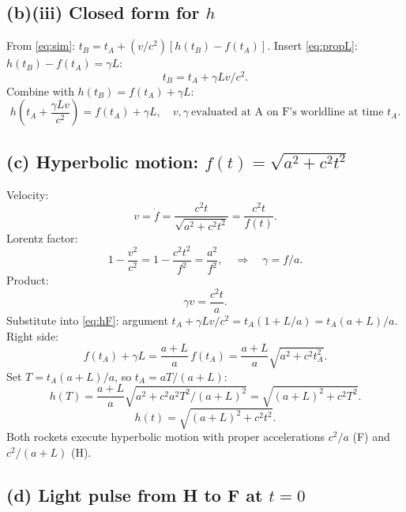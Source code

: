 \documentclass[11pt]{article}
\begin{document}
\subsection*{(b)(iii) Closed form for $h$}

From \eqref{eq:sim}: $t_B = t_A + (v/c^2)[h(t_B)-f(t_A)]$.
Insert \eqref{eq:propL}: $h(t_B)-f(t_A)=\gamma L$:
\[ t_B = t_A + \gamma L v/c^2. \]
Combine with $h(t_B)=f(t_A)+\gamma L$:
\begin{equation}
\boxed{\;h\!\left(t_A+\frac{\gamma L v}{c^2}\right) = f(t_A) + \gamma L,\quad v,\gamma\ \text{evaluated at A on F's worldline at time }t_A.\;}
\label{eq:hF}
\end{equation}

\subsection*{(c) Hyperbolic motion: $f(t)=\sqrt{a^2+c^2 t^2}$}

Velocity:
\[ v = \dot f = \frac{c^2 t}{\sqrt{a^2+c^2 t^2}} = \frac{c^2 t}{f(t)}. \]
Lorentz factor:
\[ 1-\frac{v^2}{c^2} = 1 - \frac{c^2 t^2}{f^2} = \frac{a^2}{f^2},\quad\Rightarrow\quad \gamma = f/a. \]
Product:
\begin{equation}
\boxed{\;\gamma v = \frac{c^2 t}{a}.\;}
\label{eq:gv}
\end{equation}
Substitute into \eqref{eq:hF}: argument $t_A+\gamma L v/c^2 = t_A(1+L/a) = t_A(a+L)/a$. Right side:
\[ f(t_A) + \gamma L = \frac{a+L}{a}\,f(t_A) = \frac{a+L}{a}\sqrt{a^2+c^2 t_A^2}. \]
Set $T=t_A(a+L)/a$, so $t_A=aT/(a+L)$:
\[ h(T) = \frac{a+L}{a}\sqrt{a^2 + c^2 a^2 T^2/(a+L)^2} = \sqrt{(a+L)^2 + c^2 T^2}. \]
\begin{equation}
\boxed{\;h(t) = \sqrt{(a+L)^2 + c^2 t^2}.\;}
\label{eq:h}
\end{equation}
Both rockets execute hyperbolic motion with proper accelerations $c^2/a$ (F) and $c^2/(a+L)$ (H).

\subsection*{(d) Light pulse from H to F at $t=0$}
\end{document}
